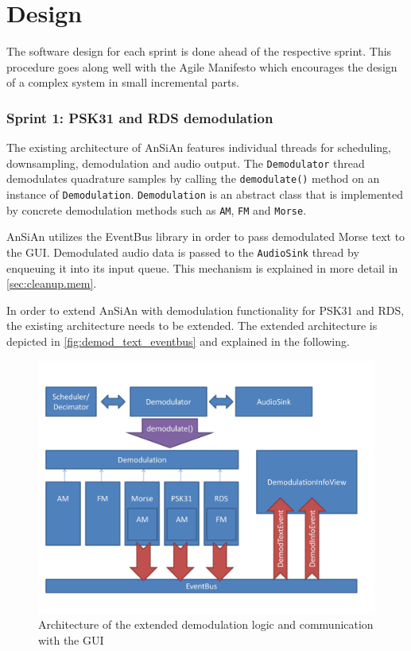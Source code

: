 \chapter{Design}\label{ch:design}

The software design for each sprint is done ahead of the respective sprint.
This procedure goes along well with the Agile Manifesto which
encourages the design of a complex system in small incremental parts.

\subsection{Sprint 1: PSK31 and RDS demodulation}

The existing architecture of \ac{AnSiAn} features individual threads for scheduling, 
downsampling, demodulation and audio output. The \texttt{De\-mo\-du\-la\-tor} thread demodulates 
quadrature samples by calling the \texttt{demodulate()} method on an instance of
\texttt{Demodulation}. \texttt{Demodulation} is an abstract class that is implemented by concrete 
demodulation methods such as \texttt{AM}, \texttt{FM} and \texttt{Morse}. 

\ac{AnSiAn} utilizes the EventBus library in order to pass demodulated Morse text
to the \ac{GUI}. Demodulated audio data is passed to the
\texttt{AudioSink} thread by enqueuing it into its input queue.
This mechanism is explained in more detail in \autoref{sec:cleanup.mem}.


In order to extend \ac{AnSiAn} with demodulation functionality for \ac{PSK31} and \ac{RDS}, 
the existing architecture needs to be extended. The extended architecture is
depicted in \autoref{fig:demod_text_eventbus} and explained in the following.

\begin{figure}
	\centering
	\includegraphics[width=1\linewidth]{gfx/demod_text_eventbus.png}
	\caption{Architecture of the extended demodulation logic and communication with the GUI}
	\label{fig:demod_text_eventbus}
\end{figure}

